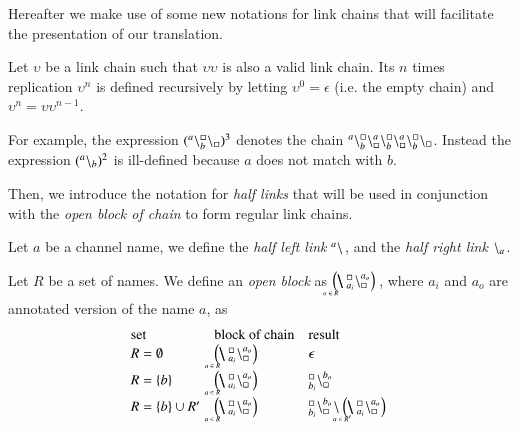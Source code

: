 Hereafter we make use of some new notations for link chains that will facilitate  
the presentation of our translation.

\begin{definition}[Replication]
Let $\upsilon$ be a link chain such that $\upsilon\upsilon$ is also a valid link chain. Its $n$ times replication $\upsilon^n$ is defined recursively by letting
$\upsilon^0 = \epsilon$ (i.e. the empty chain) and $\upsilon^n = \upsilon\upsilon^{n-1}$.
\end{definition}

For example,  the expression $({}^{a}\backslash_{b}^{\scriptstyle {\square}}\backslash_{\scriptstyle {\square}})^3$  denotes the chain ${}^{a}\backslash_{b}^{\scriptstyle {\square}}\backslash_{\scriptstyle {\square}}^{a}\backslash_{b}^{\scriptstyle {\square}}\backslash_{\scriptstyle {\square}}^{a}\backslash_{b}^{\scriptstyle {\square}}\backslash_{\scriptstyle {\square}}$. 
Instead the expression $({}^{a} \backslash_{b})^2$ is ill-defined because $a$ does not match with $b$.

Then, we introduce the notation for \emph{half links} that will be used in conjunction with the \emph{open block of chain} to form regular link chains.

\begin{definition}
Let $a$ be a channel name, we define the \emph{half left link}  ${}^{a} \backslash_{}$,   and the  \emph{half right link} ${}^{} \backslash_{a}$.
\end{definition}

\begin{definition}
Let $R$ be a set of names. We 
define an \emph{open block} as $\blockchain{a_i}{a_o}{a \in R}$, where $a_i$ and $a_o$ are annotated version of the name $a$, as
\[
\begin{array}{l@{\quad}l@{\quad}l}
\mbox{set}& \mbox{block of chain}& \mbox{result}\\
R= \emptyset & \blockchain{a_i}{a_o}{a \in R}   &\epsilon\\
R = \{ b\}    &\blockchain{a_i}{a_o}{a \in R}  & {}_{b_i}^{\noact}\chainedlink{\noact}{b_o}\\
R = \{b\} \cup R' & \blockchain{a_i}{a_o}{a \in R} & {}_{b_i}^{\noact}\chainedlink{\noact}{b_o}\link{}{}\blockchain{a_i}{a_o}{a \in R'}
\end{array}
\]
\end{definition}


